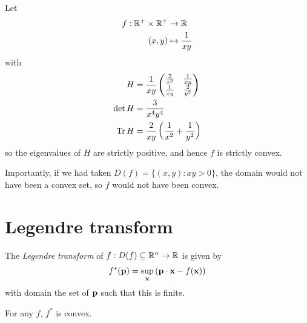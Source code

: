 \documentclass{../../template/note}
\begin{document}
    \begin{example*}
        Let
        \begin{align*}
            f: \mathbb R^+ \times \mathbb R^+ &\to \mathbb R \\
            (x, y) &\mapsto \frac 1 {xy}
        \end{align*}
        with
        \begin{align*}
            H &= \frac 1 {xy} \begin{pmatrix}
                \frac 2 {x^2} & \frac 1 {xy} \\
                \frac 1 {xy} & \frac 2 {y^2} \\
            \end{pmatrix} \\
            \det H &= \frac 3 {x^4y^4} \\
            \operatorname{Tr} H &= \frac 2 {xy} \left(\frac 1 {x^2} + \frac 1 {y^2}\right)
        \end{align*}
        so the eigenvalues of $H$ are strictly positive, and hence $f$ is strictly convex.
        
        Importantly, if we had taken $D(f) = \{(x, y): xy > 0\}$, the domain would not have been a convex set, so $f$ would not have been convex.
    \end{example*}
    
    \section{Legendre transform}

    \begin{definition*}
        The \emph{Legendre transform} of $f: D(f) \subseteq \mathbb R^n \to \mathbb R$ is given by
        \begin{align*}
            f^*(\V p) = \sup_{\V x} \left(\V p \cdot \V x - f(\V x)\right)
        \end{align*}
        with domain the set of $\V p$ such that this is finite.        
    \end{definition*}
    
    \begin{lemma}
        For any $f$, $f^*$ is convex.
    \end{lemma}
    
\end{document}
